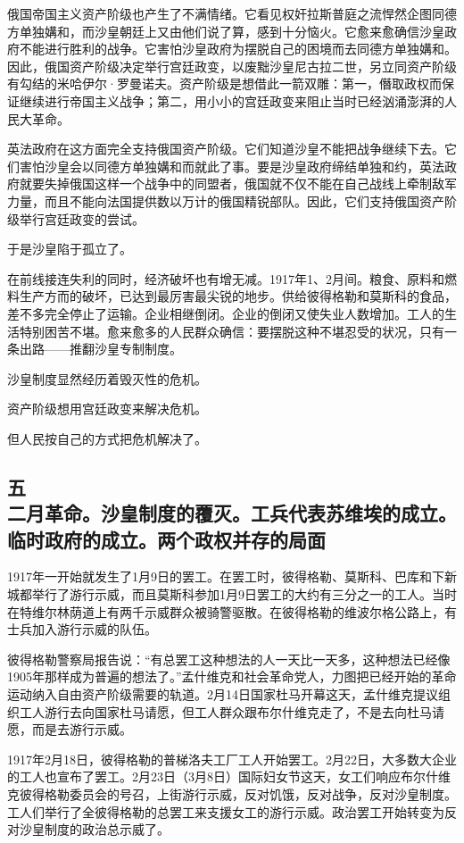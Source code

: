 俄国帝国主义资产阶级也产生了不满情绪。它看见权奸拉斯普庭之流悍然企图同德方单独媾和，而沙皇朝廷上又由他们说了算，感到十分恼火。它愈来愈确信沙皇政府不能进行胜利的战争。它害怕沙皇政府为摆脱自己的困境而去同德方单独媾和。因此，俄国资产阶级决定举行宫廷政变，以废黜沙皇尼古拉二世，另立同资产阶级有勾结的米哈伊尔·罗曼诺夫。资产阶级是想借此一箭双雕：第一，僭取政权而保证继续进行帝国主义战争；第二，用小小的宫廷政变来阻止当时已经汹涌澎湃的人民大革命。

英法政府在这方面完全支持俄国资产阶级。它们知道沙皇不能把战争继续下去。它们害怕沙皇会以同德方单独媾和而就此了事。要是沙皇政府缔结单独和约，英法政府就要失掉俄国这样一个战争中的同盟者，俄国就不仅不能在自己战线上牵制敌军力量，而且不能向法国提供数以万计的俄国精锐部队。因此，它们支持俄国资产阶级举行宫廷政变的尝试。

于是沙皇陷于孤立了。

在前线接连失利的同时，经济破坏也有增无减。1917年1、2月间。粮食、原料和燃料生产方而的破坏，已达到最厉害最尖锐的地步。供给彼得格勒和莫斯科的食品，差不多完全停止了运输。企业相继倒闭。企业的倒闭又使失业人数增加。工人的生活特别困苦不堪。愈来愈多的人民群众确信：要摆脱这种不堪忍受的状况，只有一条出路——推翻沙皇专制制度。

沙皇制度显然经历着毁灭性的危机。

资产阶级想用宫廷政变来解决危机。

但人民按自己的方式把危机解决了。


\subsection[五\q 二月革命。沙皇制度的覆灭。工兵代表苏维埃的成立。临时政府的成立。两个政权并存的局面]{五\\二月革命。沙皇制度的覆灭。工兵代表苏维埃的成立。\\临时政府的成立。两个政权并存的局面}

1917年一开始就发生了1月9日的罢工。在罢工时，彼得格勒、莫斯科、巴库和下新城都举行了游行示威，而且莫斯科参加1月9日罢工的大约有三分之一的工人。当时在特维尔林荫道上有两千示威群众被骑警驱散。在彼得格勒的维波尔格公路上，有士兵加入游行示威的队伍。

彼得格勒警察局报告说：“有总罢工这种想法的人一天比一天多，这种想法已经像1905年那样成为普遍的想法了。”孟什维克和社会革命党人，力图把已经开始的革命运动纳入自由资产阶级需要的轨道。2月14日国家杜马开幕这天，孟什维克提议组织工人游行去向国家杜马请愿，但工人群众跟布尔什维克走了，不是去向杜马请愿，而是去游行示威。

1917年2月18日，彼得格勒的普梯洛夫工厂工人开始罢工。2月22日，大多数大企业的工人也宣布了罢工。2月23日（3月8日）国际妇女节这天，女工们响应布尔什维克彼得格勒委员会的号召，上街游行示威，反对饥饿，反对战争，反对沙皇制度。工人们举行了全彼得格勒的总罢工来支援女工的游行示威。政治罢工开始转变为反对沙皇制度的政治总示威了。

